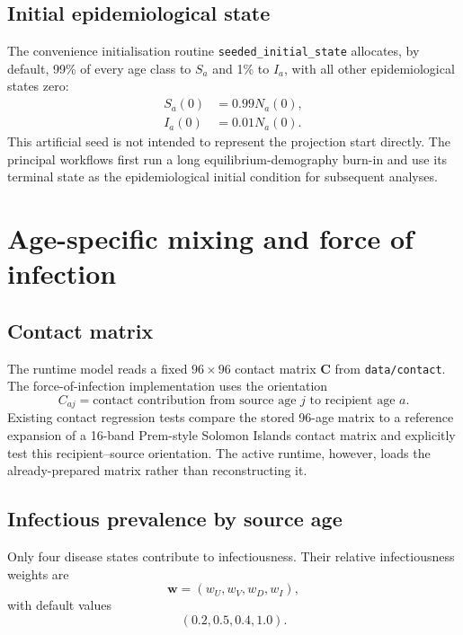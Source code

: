 \documentclass[11pt]{article}
\newcommand{\code}[1]{\texttt{#1}}
\begin{document}
\subsection{Initial epidemiological state}

The convenience initialisation routine \code{seeded\_initial\_state} allocates, by default, 99\% of every age class to $S_a$ and 1\% to $I_a$, with all other epidemiological states zero:
\begin{align}
S_a(0)&=0.99N_a(0),\\
I_a(0)&=0.01N_a(0).
\end{align}
This artificial seed is not intended to represent the projection start directly. The principal workflows first run a long equilibrium-demography burn-in and use its terminal state as the epidemiological initial condition for subsequent analyses.

\section{Age-specific mixing and force of infection}

\subsection{Contact matrix}

The runtime model reads a fixed $96\times 96$ contact matrix $\mathbf{C}$ from \code{data/contact}. The force-of-infection implementation uses the orientation
\[
C_{aj}=\text{contact contribution from source age }j\text{ to recipient age }a.
\]
Existing contact regression tests compare the stored 96-age matrix to a reference expansion of a 16-band Prem-style Solomon Islands contact matrix and explicitly test this recipient--source orientation. The active runtime, however, loads the already-prepared matrix rather than reconstructing it.

\subsection{Infectious prevalence by source age}

Only four disease states contribute to infectiousness. Their relative infectiousness weights are
\begin{equation}
\mathbf{w}=(w_U,w_V,w_D,w_I),
\end{equation}
with default values
\begin{equation}
(0.2,0.5,0.4,1.0).
\end{equation}
\end{document}
